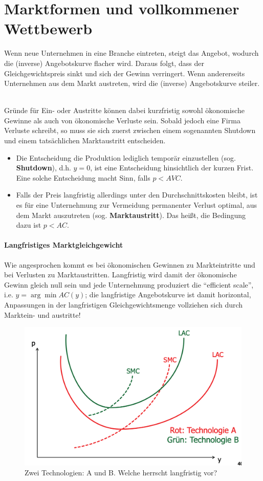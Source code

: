 \chapter{Marktformen und vollkommener Wettbewerb}

Wenn neue Unternehmen in eine Branche eintreten, steigt das Angebot, wodurch die (inverse) Angebotskurve flacher wird. Daraus folgt, dass der Gleichgewichtspreis sinkt und sich der Gewinn verringert. Wenn andererseits Unternehmen aus dem Markt austreten, wird die (inverse) Angebotskurve steiler. ~\bigskip

Gründe für Ein- oder Austritte können dabei kurzfristig sowohl ökonomische Gewinne als auch von ökonomische Verluste sein. Sobald jedoch eine Firma Verluste schreibt, so muss sie sich zuerst zwischen einem sogenannten Shutdown und einem tatsächlichen Marktaustritt entscheiden.
\begin{itemize}
	\item Die Entscheidung die Produktion lediglich temporär einzustellen (sog. \textbf{Shutdown}), d.h. $y = 0$, ist eine Entscheidung hinsichtlich der kurzen Frist. Eine solche Entscheidung macht Sinn, falls $p < AVC$.
	\item Falls der Preis langfristig allerdings unter den Durchschnittskosten bleibt, ist es für eine Unternehmung zur Vermeidung permanenter Verlust optimal, aus dem Markt auszutreten (sog. \textbf{Marktaustritt}). Das heißt, die Bedingung dazu ist $p < AC$.
\end{itemize}

\subsubsection*{Langfristiges Marktgleichgewicht}

Wie angesprochen kommt es bei ökonomischen Gewinnen zu Markteintritte und bei Verlusten zu Marktaustritten. Langfristig wird damit der ökonomische Gewinn gleich null sein und  jede Unternehmung produziert die \enquote{efficient scale}, i.e. $y = \arg \min AC(y)$; die langfristige Angebotskurve ist damit horizontal, Anpassungen in der langfristigen Gleichgewichtsmenge vollziehen sich durch Marktein- und austritte!

\begin{figure}[!htbp] \centering
	\caption*{Zwei Technologien: A und B. Welche herrscht langfristig vor?}
	\includegraphics[scale=0.2425]{img/vwlm}
\end{figure}

